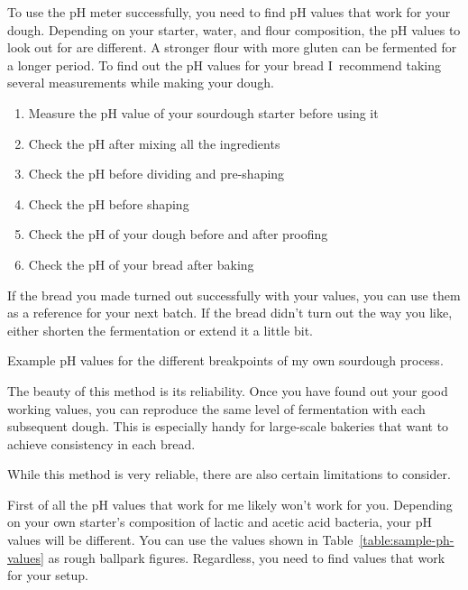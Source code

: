 To use the pH meter successfully, you need to find pH values
that work for your dough. Depending on your starter,
water, and flour composition, the pH values to look out
for are different. A stronger flour with more gluten
can be fermented for a longer period. To find out
the pH values for your bread I~recommend taking
several measurements while making your dough.

\begin{enumerate}
  \item Measure the pH value of your sourdough starter before using it
  \item Check the pH after mixing all the ingredients
  \item Check the pH before dividing and pre-shaping
  \item Check the pH before shaping
  \item Check the pH of your dough before and after proofing
  \item Check the pH of your bread after baking
\end{enumerate}

If the bread you made turned out successfully with your values,
you can use them as a reference for your next batch. If the
bread didn't turn out the way you like, either shorten
the fermentation or extend it a little bit.

\begin{table}[!htb]
    \begin{center}
        \caption[Dough's pH during bread preparation]{Example pH values for
            the different breakpoints of my own sourdough process.}%
        \label{table:sample-ph-values}
    \end{center}
\end{table}

The beauty of this method is its reliability. Once you have found
out your good working values, you can reproduce
the same level of fermentation with each subsequent dough.
This is especially handy for large-scale bakeries that want
to achieve consistency in each bread.

While this method is very reliable, there are also certain
limitations to consider.

First of all the pH values that work for me likely won't work for
you. Depending on your own starter's composition of lactic
and acetic acid bacteria, your pH values will be different.
You can use the values shown in Table~\ref{table:sample-ph-values}
as rough ballpark figures. Regardless, you need to find values
that work for your setup.

